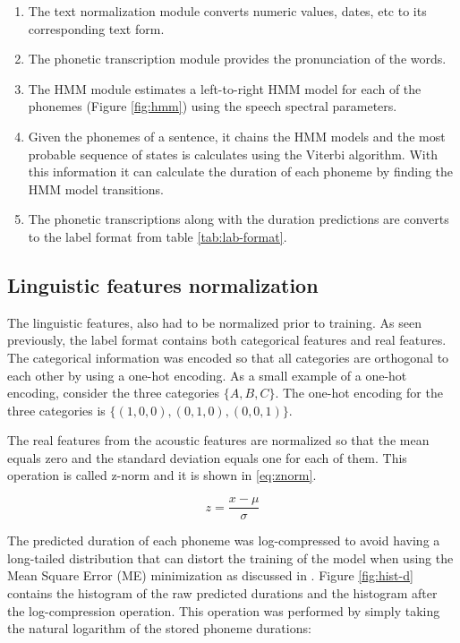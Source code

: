 \begin{enumerate}
    \item The text normalization module converts numeric values, dates, etc to its corresponding text form.
    \item The phonetic transcription module provides the pronunciation of the words.
    \item The HMM module estimates a left-to-right HMM model for each of the phonemes (Figure \ref{fig:hmm}) using the speech spectral parameters.
    \item Given the phonemes of a sentence, it chains the HMM models and the most probable sequence of states is calculates using the Viterbi algorithm. With this information it can calculate the duration of each phoneme by finding the HMM model transitions.
    \item The phonetic transcriptions along with the duration predictions are converts to the label format from table \ref{tab:lab-format}.
\end{enumerate}

\subsection{Linguistic features normalization}

The linguistic features, also had to be normalized prior to training. As seen previously, the label format contains both categorical features and real features. The categorical information was encoded so that all categories are orthogonal to each other by using a one-hot encoding. As a small example of a one-hot encoding, consider the three categories $\{A, B, C\}$. The  one-hot encoding for the three categories is $\{(1,0,0), (0,1,0), (0,0,1)\}$.

The real features from the acoustic features are normalized so that the mean equals zero and the standard deviation equals one for each of them. This operation is called z-norm and it is shown in \ref{eq:znorm}.

\begin{equation}
    z = \frac{x - \mu}{\sigma}
    \label{eq:znorm}
\end{equation}

The predicted duration of each phoneme was log-compressed to avoid having a long-tailed distribution that can distort the training of the model when using the Mean Square Error (ME) minimization as discussed in \cite{pascual2006deep}. Figure \ref{fig:hist-d} contains the histogram of the raw predicted durations and the histogram after the log-compression operation. This operation was performed by simply taking the natural logarithm of the stored phoneme durations:

